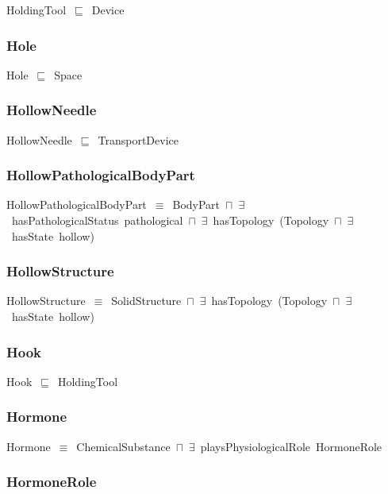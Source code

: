 \documentclass{article}
\begin{document}
HoldingTool~\ensuremath{\sqsubseteq}~Device~

\subsubsection*{Hole}

Hole~\ensuremath{\sqsubseteq}~Space~

\subsubsection*{HollowNeedle}

HollowNeedle~\ensuremath{\sqsubseteq}~TransportDevice~

\subsubsection*{HollowPathologicalBodyPart}

HollowPathologicalBodyPart~\ensuremath{\equiv}~BodyPart~\ensuremath{\sqcap}~\ensuremath{\exists}~hasPathologicalStatus~pathological~\ensuremath{\sqcap}~\ensuremath{\exists}~hasTopology~(Topology~\ensuremath{\sqcap}~\ensuremath{\exists}~hasState~hollow)

\subsubsection*{HollowStructure}

HollowStructure~\ensuremath{\equiv}~SolidStructure~\ensuremath{\sqcap}~\ensuremath{\exists}~hasTopology~(Topology~\ensuremath{\sqcap}~\ensuremath{\exists}~hasState~hollow)

\subsubsection*{Hook}

Hook~\ensuremath{\sqsubseteq}~HoldingTool~

\subsubsection*{Hormone}

Hormone~\ensuremath{\equiv}~ChemicalSubstance~\ensuremath{\sqcap}~\ensuremath{\exists}~playsPhysiologicalRole~HormoneRole

\subsubsection*{HormoneRole}
\end{document}
